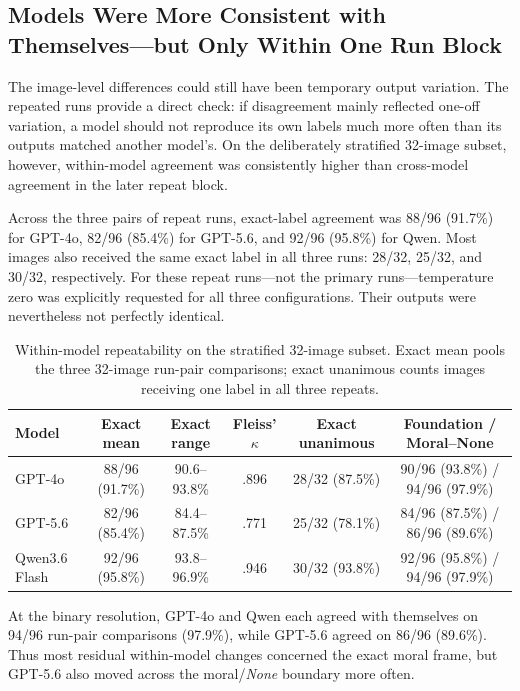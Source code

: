 \FloatBarrier
\subsection{Models Were More Consistent with Themselves---but Only Within One Run Block}
\label{sec:repeatability_results}

The image-level differences could still have been temporary output variation.
The repeated runs provide a direct check: if disagreement mainly reflected
one-off variation, a model should not reproduce its own labels much more often
than its outputs matched another model's. On the deliberately stratified
32-image subset, however, within-model agreement was consistently higher than
cross-model agreement in the later repeat block.

Across the three pairs of repeat runs, exact-label agreement was 88/96 (91.7\%)
for GPT-4o, 82/96 (85.4\%) for GPT-5.6, and 92/96 (95.8\%) for Qwen. Most
images also received the same exact label in all three runs: 28/32, 25/32, and
30/32, respectively. For these repeat runs---not the primary runs---temperature
zero was explicitly requested for all three configurations. Their outputs were
nevertheless not perfectly identical.

\begin{table}[!htbp]
    \centering
    \caption{Within-model repeatability on the stratified 32-image subset.
    Exact mean pools the three 32-image run-pair comparisons; exact unanimous
    counts images receiving one label in all three repeats.}
    \label{tab:within_repeatability}
    \scriptsize
    \setlength{\tabcolsep}{3.5pt}
    \begin{tabular}{lccccc}
        \toprule
        Model & Exact mean & Exact range & Fleiss' \(\kappa\) &
        Exact unanimous & Foundation / Moral--None \\
        \midrule
        GPT-4o & 88/96 (91.7\%) & 90.6--93.8\% & .896 &
        28/32 (87.5\%) & 90/96 (93.8\%) / 94/96 (97.9\%) \\
        GPT-5.6 & 82/96 (85.4\%) & 84.4--87.5\% & .771 &
        25/32 (78.1\%) & 84/96 (87.5\%) / 86/96 (89.6\%) \\
        Qwen3.6 Flash & 92/96 (95.8\%) & 93.8--96.9\% & .946 &
        30/32 (93.8\%) & 92/96 (95.8\%) / 94/96 (97.9\%) \\
        \bottomrule
    \end{tabular}
\end{table}

At the binary resolution, GPT-4o and Qwen each agreed with themselves on
94/96 run-pair comparisons (97.9\%), while GPT-5.6 agreed on 86/96 (89.6\%).
Thus most residual within-model changes concerned the exact moral frame, but
GPT-5.6 also moved across the moral/\textit{None} boundary more often.

